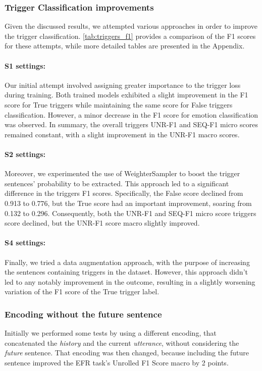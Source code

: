 \documentclass[11pt,table,xcdraw]{article}
\begin{document}
\subsubsection{Trigger Classification improvements}
Given the discussed results, we attempted various approaches in order to improve the trigger classification. \autoref{tab:triggers_f1} provides a comparison of the F1 scores for these attempts, while more detailed tables are presented in the Appendix.
\paragraph{S1 settings:} Our initial attempt involved assigning greater importance to the trigger loss during training. Both trained models exhibited a slight improvement in the F1 score for True triggers while maintaining the same score for False triggers classification. However, a minor decrease in the F1 score for emotion classification was observed. In summary, the overall triggers UNR-F1 and SEQ-F1 micro scores remained constant, with a slight improvement in the UNR-F1 macro scores.

\paragraph{S2 settings:} Moreover, we experimented the use of WeighterSampler to boost the trigger sentences' probability to be extracted. This approach led to a significant difference in the triggers F1 scores. Specifically, the False score declined from 0.913 to 0.776, but the True score had an important improvement, soaring from 0.132 to 0.296.
Consequently, both the UNR-F1 and SEQ-F1 micro score triggers score declined, but the UNR-F1 score macro slightly improved.

\paragraph{S4 settings:}Finally, we tried a data augmentation approach, with the purpose of increasing the sentences containing triggers in the dataset. However, this approach didn't led to any notably improvement in the outcome, resulting in a slightly worsening variation of the F1 score of the True trigger label.

\subsubsection{Encoding without the future sentence}
Initially we performed some tests by using a different encoding, that concatenated the \textit{history} and the current \textit{utterance}, without considering the \textit{future} sentence. That encoding was then changed, because including the future sentence improved the EFR task's Unrolled F1 Score macro by 2 points.
\end{document}
